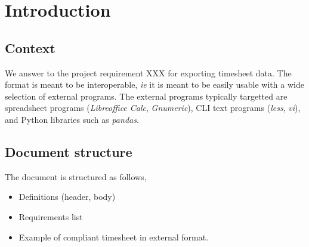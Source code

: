 \section{Introduction}
\subsection{Context}
We answer to the project requirement XXX for exporting timesheet data.
The format is meant to be interoperable, \textit{ie} it is meant to be
easily usable with a wide selection of external programs. The external
programs typically targetted are spreadsheet programs (\emph{Libreoffice Calc},
\emph{Gnumeric}), \gls{CLI} text programs (\emph{less}, \emph{vi}),
and Python libraries such as \emph{pandas}.

\subsection{Document structure}
The document is structured as follows,

\begin{itemize}
\item Definitions (header, body)
\item Requirements list
\item Example of compliant timesheet in external format.
\end{itemize}
